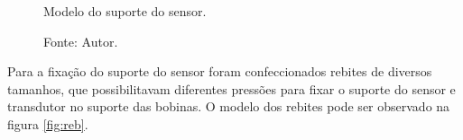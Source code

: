 \begin{figure}[H]
    \centering
     \caption{Modelo do suporte do sensor.}
     \caption*{Fonte: Autor.}\label{fig:sups}
\end{figure}

Para a fixação do suporte do sensor foram confeccionados rebites de diversos tamanhos, que possibilitavam diferentes pressões para fixar o suporte do sensor e transdutor no suporte das bobinas. O modelo dos rebites pode ser observado na figura \ref{fig:reb}.

